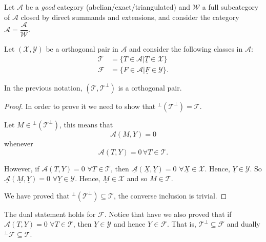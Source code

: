 Let $\mathcal{A}$ be a \emph{good} category (abelian/exact/triangulated) and $\mathcal{W}$ a full subcategory of $\mathcal{A}$ closed by direct summands and extensions, and consider the category $\underline{\mathcal{A}}=\dfrac{\mathcal{A}}{\mathcal{W}}$.

Let $(\mathcal{X},\mathcal{Y})$ be a orthogonal pair in $\underline{\mathcal{A}}$ and consider the following classes in $\mathcal{A}$:
\begin{align*}
  \mathcal{T} &= \{ T\in\mathcal{A} | \underline{T}\in\mathcal{X} \} \\
  \mathcal{F} &= \{ F\in\mathcal{A} | \underline{F}\in\mathcal{Y} \}.
\end{align*}

\begin{lemma}
  In the previous notation, $(\mathcal{T}, \mathcal{T}^\perp)$ is a orthogonal pair.
\end{lemma}

\begin{proof}
  In order to prove it we need to show that $^\perp(\mathcal{T}^\perp) = \mathcal{T}$.

  Let $M\in {^\perp(\mathcal{T}^\perp)}$, this means that
  \begin{equation}
    \mathcal{A}(M,Y) = 0
  \end{equation}
  whenever
  \begin{equation}
    \mathcal{A}(T,Y) = 0\,\forall T\in\mathcal{T}.
  \end{equation}

  However, if $\mathcal{A}(T,Y)=0$ $\forall T\in\mathcal{T}$, then $\underline{\mathcal{A}}(\underline{X},\underline{Y})=0$ $\forall \underline{X}\in\mathcal{X}$. Hence, $\underline{Y}\in\mathcal{Y}$.
  So $\underline{\mathcal{A}}(\underline{M},\underline{Y})=0$ $\forall \underline{Y}\in\mathcal{Y}$. Hence, $\underline{M}\in\mathcal{X}$ and so $M\in\mathcal{T}$.

  We have proved that $^\perp(\mathcal{T}^\perp) \subseteq \mathcal{T}$, the converse inclusion is trivial.
\end{proof}

\begin{rmk}
  The dual statement holds for $\mathcal{F}$. Notice that have we also proved that if $\mathcal{A}(T,Y)=0$ $\forall T\in\mathcal{T}$, then $\underline{Y}\in\mathcal{Y}$ and hence $Y\in\mathcal{F}$. That is, $\mathcal{T}^\perp \subseteq \mathcal{F}$ and dually $^\perp\mathcal{F}\subseteq \mathcal{T}$.
\end{rmk}


